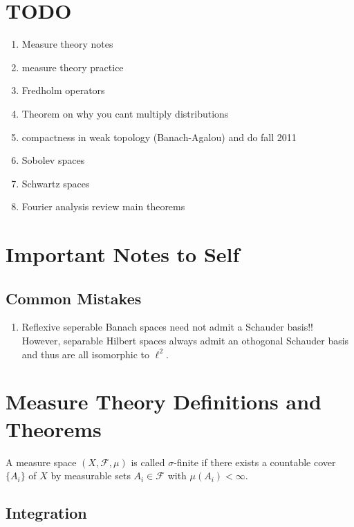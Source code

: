 \documentclass[12pt]{article}
\renewcommand{\F}{\mathcal{F}}
\begin{document}
\tableofcontents

\section{TODO}

\begin{enumerate}
\item Measure theory notes
\item measure theory practice
\item Fredholm operators
\item Theorem on why you cant multiply distributions
\item compactness in weak topology (Banach-Agalou) and do fall 2011
\item Sobolev spaces
\item Schwartz spaces
\item Fourier analysis review main theorems
\end{enumerate}

\section{Important Notes to Self}

\subsection{Common Mistakes}

\begin{enumerate}
\item Reflexive seperable Banach spaces need not admit a Schauder basis!! However, separable Hilbert spaces always admit an othogonal Schauder basis and thus are all isomorphic to $\ell^2$.
\end{enumerate}

\section{Measure Theory Definitions and Theorems}

\begin{defn}
A measure space  $(X, \F, \mu)$ is called $\sigma$-finite if there exists a countable cover $\{ A_i \}$ of $X$ by measurable sets $A_i \in \F$ with $\mu(A_i) < \infty$.
\end{defn}



\subsection{Integration}
\end{document}
